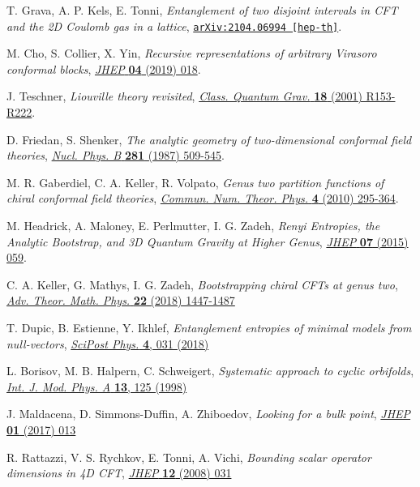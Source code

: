 \documentclass[a4paper,11pt]{article}
\begin{document}
\begin{thebibliography}{99}
 T. Grava, A. P. Kels, E. Tonni, \emph{Entanglement of two disjoint intervals in CFT and the 2D Coulomb gas in a lattice},
\href{https://arxiv.org/abs/2104.06994}{\texttt{arXiv:2104.06994 [hep-th]}}.

 M. Cho, S. Collier, X. Yin, \emph{Recursive representations of arbitrary Virasoro conformal blocks}, 
\href{https://doi.org/10.1007/JHEP04(2019)018}{\emph{JHEP} {\bf 04} (2019) 018}.

 J. Teschner, \emph{Liouville theory revisited}, \href{https://doi.org/10.1088/0264-9381/18/23/201}{\emph{Class. Quantum Grav.} {\bf 18} (2001) R153-R222}.

 D. Friedan, S. Shenker, \emph{The analytic geometry of two-dimensional conformal field theories}, \href{https://doi.org/10.1016/0550-3213(87)90418-4}{\emph{Nucl. Phys. B} {\bf 281} (1987) 509-545}.

 M. R. Gaberdiel, C. A. Keller, R. Volpato, \emph{Genus two partition functions of chiral conformal field theories},
\href{https://dx.doi.org/10.4310/CNTP.2010.v4.n2.a2}{\emph{Commun. Num. Theor. Phys.} {\bf 4} (2010) 295-364}.

 M. Headrick, A. Maloney, E. Perlmutter, I. G. Zadeh, \emph{Renyi Entropies, the Analytic Bootstrap, and 3D Quantum Gravity at Higher Genus}, \href{https://doi.org/10.1007/JHEP07(2015)059}{\emph{JHEP} {\bf 07} (2015) 059}.

 C. A. Keller, G. Mathys, I. G. Zadeh, \emph{Bootstrapping chiral CFTs at genus two},
\href{https://dx.doi.org/10.4310/ATMP.2018.v22.n6.a3}{\emph{Adv. Theor. Math. Phys.} {\bf 22} (2018) 1447-1487}

 T. Dupic, B. Estienne, Y. Ikhlef, \emph{Entanglement entropies of minimal models from null-vectors}, 
\href{https://scipost.org/10.21468/SciPostPhys.4.6.031}{\emph{SciPost Phys.} {\bf 4}, 031 (2018)}

 L. Borisov, M. B. Halpern, C. Schweigert, \emph{Systematic approach to cyclic orbifolds}, 
\href{https://doi.org/10.1142/S0217751X98000044}{\emph{Int. J. Mod. Phys. A} {\bf 13}, 125 (1998)}

 J. Maldacena, D. Simmons-Duffin, A. Zhiboedov, \emph{Looking for a bulk point},
\href{ https://doi.org/10.1007/JHEP01(2017)013}{\emph{JHEP} {\bf 01} (2017) 013}

 R. Rattazzi, V. S. Rychkov, E. Tonni, A. Vichi, \emph{Bounding scalar operator dimensions in 4D CFT},
\href{https://doi.org/10.1088/1126-6708/2008/12/031}{\emph{JHEP} {\bf 12} (2008) 031}


\end{thebibliography}
\end{document}
